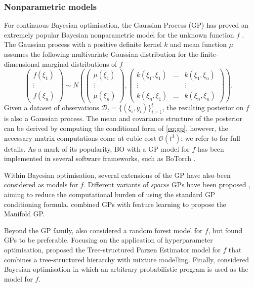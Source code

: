 \documentclass[a4paper, 10pt]{report}
\theoremstyle{plain}
\begin{document}
	\subsubsection{Nonparametric models}
	For continuous Bayesian optimisation, the Gaussian Process (GP) \citep{williams2006gaussian} has proved an extremely popular Bayesian nonparametric model for the unknown function $f$ \citep{osborne2009gaussian}.
	The Gaussian process with a positive definite kernel $k$ and mean function $\mu$ assumes the following multivariate Gaussian distribution for the finite-dimensional marginal distributions \citep{oksendal2003stochastic} of $f$
	\begin{equation}
	\label{eq:gp}
	\begin{pmatrix}
	f(\xi_1) \\
	\vdots \\
	f(\xi_n)
	\end{pmatrix}
	\sim 
	N \left(
	\begin{pmatrix}
	\mu(\xi_1)\\
	\vdots\\
	\mu(\xi_n)
	\end{pmatrix},
	\begin{pmatrix}
	k(\xi_1,\xi_1) & \dots & k(\xi_1,\xi_n)\\
	\vdots &  & \vdots \\
	k(\xi_n,\xi_1) & \dots & k(\xi_n,\xi_n)
	\end{pmatrix}
	\right).
	\end{equation}
	Given a dataset of observations $\mathcal{D}_t = \{(\xi_i,y_i)\}_{i=1}^t$, the resulting posterior on $f$ is also a Gaussian process. The mean and covariance structure of the posterior can be derived by computing the conditional form of \eqref{eq:gp}, however, the necessary matrix computations come at cubic cost $\mathcal{O}(t^3)$; we refer to \citet{williams2006gaussian} for full details.
	As a mark of its popularity, BO with a GP model for $f$ has been implemented in several software frameworks, such as BoTorch \citep{balandat2020botorch}.
	
	Within Bayesian optimisation, several extensions of the GP have also been considered as models for $f$.
	Different variants of \emph{sparse} GPs have been proposed \citep{quinonero2005unifying,snelson2006sparse,lazaro2010sparse}, aiming to reduce the computational burden of using the standard GP conditioning formula.
	\citet{calandra2016manifold} combined GPs with feature learning to propose the Manifold GP.
	
	Beyond the GP family, \citet{hutter2013evaluation} also considered a random forest model for $f$, but found GPs to be preferable.
	Focusing on the application of hyperparameter optimisation, \citet{bergstra2011algorithms} proposed the Tree-structured Parzen Estimator model for $f$ that combines a tree-structured hierarchy with mixture modelling.
	Finally, \citet{neiswanger2019probo} considered Bayesian optimisation in which an arbitrary probabilistic program is used as the model for $f$.
	
\end{document}
